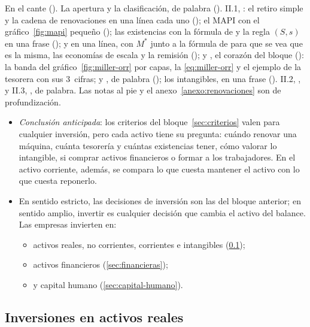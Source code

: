 \documentclass[11pt]{article}
\begin{document}
\begin{notaopositor}
En el cante (). La apertura y la clasificación, de palabra (). II.1, : el retiro simple y la cadena de renovaciones en una línea cada uno (); el MAPI con el gráfico~\ref{fig:mapi} pequeño (); las existencias con la fórmula de  y la regla $(S,s)$ en una frase ();  y  en una línea, con $M^*$ junto a la fórmula de  para que se vea que es la misma, las economías de escala y la remisión  ();  y , el corazón del bloque (): la banda del gráfico~\ref{fig:miller-orr} por capas, la \eqref{eq:miller-orr} y el ejemplo de la tesorera con sus 3~cifras;  y , de palabra (); los intangibles, en una frase (). II.2, , y II.3, , de palabra. Las notas al pie y el anexo~\ref{anexo:renovaciones} son de profundización.
\end{notaopositor}

\begin{itemize}
\item \emph{Conclusión anticipada}: los criterios del bloque~\ref{sec:criterios} valen para cualquier inversión, pero cada activo tiene su pregunta: cuándo renovar una máquina, cuánta tesorería y cuántas existencias tener, cómo valorar lo intangible, si comprar activos financieros o formar a los trabajadores. En el activo corriente, además, se compara lo que cuesta mantener el activo con lo que cuesta reponerlo.
\item En sentido estricto, las decisiones de inversión son las del bloque anterior; en sentido amplio, invertir es cualquier decisión que cambia el activo del balance. Las empresas invierten en:
  \begin{itemize}
  \item activos reales, no corrientes, corrientes e intangibles (\ref{sec:activos-reales});
  \item activos financieros (\ref{sec:financieras});
  \item y capital humano (\ref{sec:capital-humano}).
  \end{itemize}
\end{itemize}

\subsection{Inversiones en activos reales}\label{sec:activos-reales}
\end{document}
